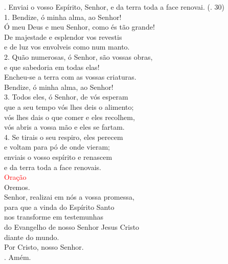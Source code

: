 \documentclass{book}
\begin{document}
\begin{flushleft}
    {\color{red} \Rbar.} Enviai o vosso Espírito, Senhor, e da terra toda a face renovai.
    \hspace{\fill}
    {\color{red} (\Rbar. 30)}
    \vspace{0.1cm} \\
    1. Bendize, ó minha alma, ao Senhor! \\
    Ó meu Deus e meu Senhor, como és tão grande! \\
    De majestade e esplendor vos revestis \\
    e de luz vos envolveis como num manto.
    \vspace{0.1cm} \\
    2. Quão numerosas, ó Senhor, são vossas obras, \\
    e que sabedoria em todas elas! \\
    Encheu-se a terra com as vossas criaturas. \\
    Bendize, ó minha alma, ao Senhor!
    \vspace{0.1cm} \\
    3. Todos eles, ó Senhor, de vós esperam \\
    que a seu tempo vós lhes deis o alimento; \\
    vós lhes dais o que comer e eles recolhem, \\
    vós abris a vossa mão e eles se fartam.
    \vspace{0.1cm} \\
    4. Se tirais o seu respiro, eles perecem \\
    e voltam para pó de onde vieram; \\
    enviais o vosso espírito e renascem \\
    e da terra toda a face renovais.
    \vspace{0.2cm} \\
    \textcolor{red}{Oração}
    \vspace{0.1cm} \\
    Oremos.
    \vspace{0.1cm}\\
    Senhor, realizai em nós a vossa promessa, \\
    para que a vinda do Espírito Santo \\
    nos transforme em testemunhas \\
    do Evangelho de nosso Senhor Jesus Cristo \\
    diante do mundo. \\
    Por Cristo, nosso Senhor. \\
    {\color{red} \Rbar.} Amém.


\end{flushleft}
\end{document}
